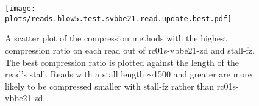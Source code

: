 \begin{figure}
\centering
%
\texttt{[image: plots/reads.blow5.test.svbbe21.read.update.best.pdf]}
	\caption[A scatter plot of the compression methods with
the highest compression ratio on each read out of rc01s-vbbe21-zd and stall-fz.]{\label{fig:stall-best}A scatter plot of the compression methods with
the highest compression ratio on each read out of rc01s-vbbe21-zd and stall-fz. The
best compression ratio is plotted against the length of the read's stall. Reads
with a stall length $\sim$1500 and greater are more likely to be compressed
smaller with stall-fz rather than rc01s-vbbe21-zd.}
\end{figure}
